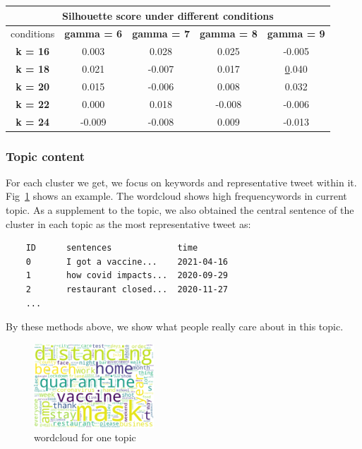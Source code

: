 \begin{table}[]
\begin{tabular}{ccccc}
\hline
\multicolumn{5}{c}{Silhouette score under different conditions}                                                                                                    \\ \hline
\multicolumn{1}{|c|}{conditions} &
  \multicolumn{1}{l|}{\textbf{gamma = 6}} &
  \multicolumn{1}{c|}{\textbf{gamma = 7}} &
  \multicolumn{1}{c|}{\textbf{gamma = 8}} &
  \multicolumn{1}{c|}{\textbf{gamma = 9}} \\ \hline
\multicolumn{1}{|c|}{\textbf{k = 16}} & \multicolumn{1}{c|}{0.003}  & \multicolumn{1}{c|}{0.028}  & \multicolumn{1}{c|}{0.025}  & \multicolumn{1}{c|}{-0.005}      \\ \hline
\multicolumn{1}{|c|}{\textbf{k = 18}} & \multicolumn{1}{c|}{0.021}  & \multicolumn{1}{c|}{-0.007} & \multicolumn{1}{c|}{0.017}  & \multicolumn{1}{c|}{{\ul 0.040}} \\ \hline
\multicolumn{1}{|c|}{\textbf{k = 20}} & \multicolumn{1}{c|}{0.015}  & \multicolumn{1}{c|}{-0.006} & \multicolumn{1}{c|}{0.008}  & \multicolumn{1}{c|}{0.032}       \\ \hline
\multicolumn{1}{|c|}{\textbf{k = 22}} & \multicolumn{1}{c|}{0.000}  & \multicolumn{1}{c|}{0.018}  & \multicolumn{1}{c|}{-0.008} & \multicolumn{1}{c|}{-0.006}      \\ \hline
\multicolumn{1}{|c|}{\textbf{k = 24}} & \multicolumn{1}{c|}{-0.009} & \multicolumn{1}{c|}{-0.008} & \multicolumn{1}{c|}{0.009}  & \multicolumn{1}{c|}{-0.013}      \\ \hline
\end{tabular}
\end{table}

\subsubsection{Topic content}
For each cluster we get, we focus on keywords and representative tweet within it. Fig~\ref{fig:wordcloud} shows an example. The wordcloud shows high frequencywords in current topic. As a supplement to the topic, we also obtained the central sentence of the cluster in each topic as the most representative tweet as:
\begin{verbatim}
    ID      sentences             time
    0       I got a vaccine...    2021-04-16 
    1       how covid impacts...  2020-09-29
    2       restaurant closed...  2020-11-27
    ...  
\end{verbatim} 
By these methods above, we show what people really care about in this topic.
\begin{figure}
\centering
{
\includegraphics[width=0.4\textwidth]{imgs/lda_bert/Topic0_wordcloud.png}
\caption{wordcloud for one topic}
\label{fig:wordcloud}
}
\end{figure}


